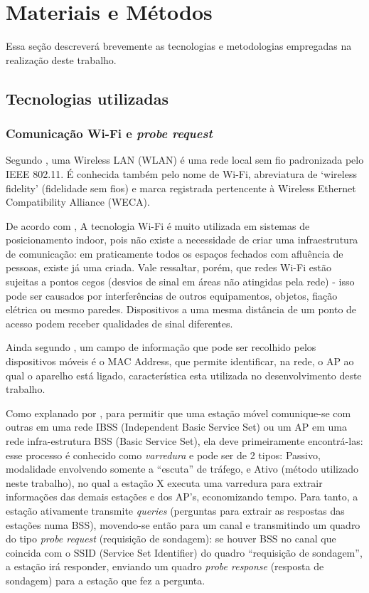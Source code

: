 
\chapter{Materiais e Métodos}
\label{metodologia}
Essa seção descreverá brevemente as tecnologias e metodologias empregadas na realização deste trabalho.

\section{Tecnologias utilizadas}
\label{tecnologias-usadas}

\subsection{Comunicação Wi-Fi e \emph{probe request}}
Segundo \cite{Teleco2008}, uma Wireless LAN (WLAN) é uma rede local sem fio padronizada pelo IEEE 802.11. É conhecida também pelo nome de Wi-Fi, abreviatura de ‘wireless fidelity’ (fidelidade sem fios) e marca registrada pertencente à Wireless Ethernet Compatibility Alliance (WECA). 

De acordo com \cite{SIMOES2015}, A tecnologia Wi-Fi é muito utilizada em sistemas de posicionamento indoor, pois não existe a necessidade de criar uma infraestrutura de comunicação: em praticamente todos os espaços fechados com afluência de pessoas, existe já uma criada. Vale ressaltar, porém, que redes Wi-Fi estão sujeitas a pontos cegos (desvios de sinal em áreas não atingidas pela rede) - isso pode ser causados por interferências de outros equipamentos, objetos, fiação elétrica ou mesmo paredes. Dispositivos a uma mesma distância de um ponto de acesso podem receber qualidades de sinal diferentes. 

Ainda segundo \cite{SIMOES2015}, um campo de informação que pode ser recolhido pelos dispositivos móveis é o MAC Address, que permite identificar, na rede, o AP ao qual o aparelho está ligado, característica esta utilizada no desenvolvimento deste trabalho. 

Como explanado por \cite{Teleco2016}, para permitir que uma estação móvel comunique-se com outras em uma rede IBSS (Independent Basic Service Set) ou um AP em uma rede infra-estrutura BSS (Basic Service Set), ela deve primeiramente encontrá-las: esse processo é conhecido como \emph{varredura} e pode ser de 2 tipos: Passivo, modalidade envolvendo somente a “escuta” de tráfego, e Ativo (método utilizado neste trabalho), no qual a estação X executa uma varredura para extrair informações das demais estações e dos AP’s, economizando tempo. Para tanto, a estação ativamente transmite \emph{queries} (perguntas para extrair as respostas das estações numa BSS), movendo-se então para um canal e transmitindo um quadro do tipo \emph{probe request} (requisição de sondagem): se houver BSS no canal que coincida com o SSID (Service Set Identifier) do quadro “requisição de sondagem”, a estação irá responder, enviando um quadro \emph{probe response} (resposta de sondagem) para a estação que fez a pergunta.

